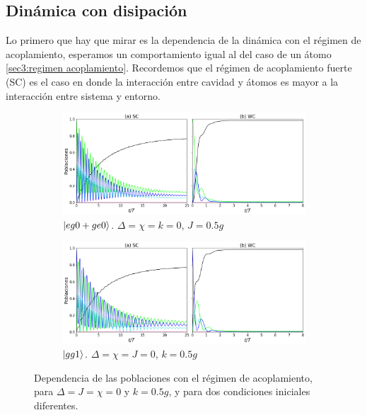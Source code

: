 \subsection{Dinámica con disipación}
Lo primero que hay que mirar es la dependencia de la dinámica con el régimen de acoplamiento, esperamos un comportamiento igual al del caso de un átomo \ref{sec3:regimen acoplamiento}. Recordemos que el régimen de acoplamiento fuerte (SC) es el caso en donde la interacción entre cavidad y átomos es mayor a la interacción entre sistema y entorno.
\begin{figure}[h]
    \centering
    \begin{subfigure}{0.7\textwidth}
        \includegraphics[width=\textwidth]{figuras/ch4/sc vs wc eg0 sim j0.5.png}
        \caption{$\ket{eg0+ge0}$. $\Delta=\chi=k=0$, $J=0.5g$}
        \label{fig4:acoplamiento eg0 sim}
    \end{subfigure}
    \vfill
    \begin{subfigure}{0.7\textwidth}
        \includegraphics[width=\textwidth]{figuras/ch4/sc vs wc gg1 k=0.5.png}
        \caption{$\ket{gg1}$. $\Delta=\chi=J=0$, $k=0.5g$ }
        \label{fig4:acoplamiento gg1}
    \end{subfigure}
    \caption{Dependencia de las poblaciones con el régimen de acoplamiento, para $\Delta=J=\chi=0$ y $k=0.5g$, y para dos condiciones iniciales diferentes.}
    \label{fig4:regimen acoplamiento}
\end{figure}
